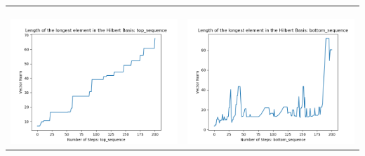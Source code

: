 \documentclass[10pt]{article}
\begin{document}
\begin{tabular}{c|c}
\begin{minipage}{.45\textwidth}
\end{minipage} \\ \\
\hline \\\begin{minipage}{.45\textwidth}
\includegraphics[width=\textwidth]{"DATA/5d/6 generators 2 bound B/top_sequence LENGTH"}
\end{minipage} &
\begin{minipage}{.45\textwidth}
\includegraphics[width=\textwidth]{"DATA/5d/6 generators 2 bound B bottomup/bottom_sequence LENGTH"}
\end{minipage}
\end{tabular}
\end{document}

